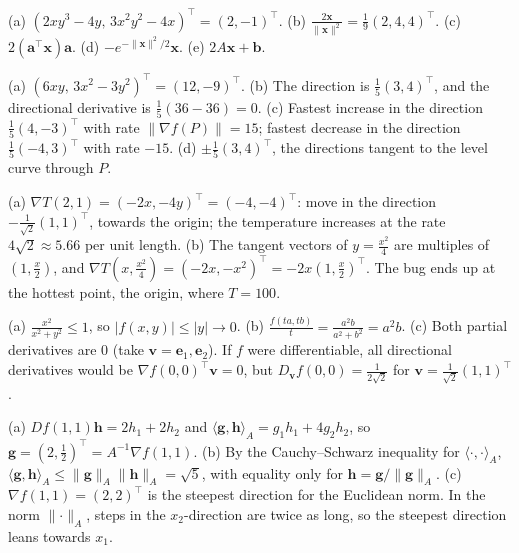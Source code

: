 \documentclass[11pt]{article}
\newcommand{\norm}[1]{\lVert #1 \rVert}
\newcommand{\ip}[2]{\langle #1, #2 \rangle}
\begin{document}
\begin{description}[leftmargin=0pt, itemsep=0.3em]
    \item[\ref{pr:gradients-compute}.] (a) $(2xy^3 - 4y, \, 3x^2y^2 - 4x)^\top = (2, -1)^\top$. (b) $\frac{2\mathbf{x}}{\norm{\mathbf{x}}^2} = \frac{1}{9}(2, 4, 4)^\top$. (c) $2(\mathbf{a}^\top\mathbf{x})\mathbf{a}$. (d) $-e^{-\norm{\mathbf{x}}^2/2}\mathbf{x}$. (e) $2A\mathbf{x} + \mathbf{b}$.
    \item[\ref{pr:directional}.] (a) $(6xy, \, 3x^2 - 3y^2)^\top = (12, -9)^\top$. (b) The direction is $\frac{1}{5}(3, 4)^\top$, and the directional derivative is $\frac{1}{5}(36 - 36) = 0$. (c) Fastest increase in the direction $\frac{1}{5}(4, -3)^\top$ with rate $\norm{\nabla f(P)} = 15$; fastest decrease in the direction $\frac{1}{5}(-4, 3)^\top$ with rate $-15$. (d) $\pm\frac{1}{5}(3, 4)^\top$, the directions tangent to the level curve through $P$.
    \item[\ref{pr:temperature}.] (a) $\nabla T(2, 1) = (-2x, -4y)^\top = (-4, -4)^\top$: move in the direction $-\frac{1}{\sqrt{2}}(1, 1)^\top$, towards the origin; the temperature increases at the rate $4\sqrt{2} \approx 5.66$ per unit length. (b) The tangent vectors of $y = \frac{x^2}{4}$ are multiples of $(1, \frac{x}{2})$, and $\nabla T(x, \frac{x^2}{4}) = (-2x, -x^2)^\top = -2x(1, \frac{x}{2})^\top$. The bug ends up at the hottest point, the origin, where $T = 100$.
    \item[\ref{pr:directional-not-diff}.] (a) $\frac{x^2}{x^2 + y^2} \leq 1$, so $|f(x, y)| \leq |y| \to 0$. (b) $\frac{f(ta, tb)}{t} = \frac{a^2 b}{a^2 + b^2} = a^2 b$. (c) Both partial derivatives are $0$ (take $\mathbf{v} = \mathbf{e}_1, \mathbf{e}_2$). If $f$ were differentiable, all directional derivatives would be $\nabla f(0, 0)^\top\mathbf{v} = 0$, but $D_{\mathbf{v}} f(0, 0) = \frac{1}{2\sqrt{2}}$ for $\mathbf{v} = \frac{1}{\sqrt{2}}(1, 1)^\top$.
    \item[\ref{pr:gradient-ip}.] (a) $Df(1, 1)\mathbf{h} = 2h_1 + 2h_2$ and $\ip{\mathbf{g}}{\mathbf{h}}_A = g_1 h_1 + 4g_2 h_2$, so $\mathbf{g} = (2, \frac{1}{2})^\top = A^{-1}\nabla f(1, 1)$. (b) By the Cauchy--Schwarz inequality for $\ip{\cdot}{\cdot}_A$, $\ip{\mathbf{g}}{\mathbf{h}}_A \leq \norm{\mathbf{g}}_A\norm{\mathbf{h}}_A = \sqrt{5}$, with equality only for $\mathbf{h} = \mathbf{g}/\norm{\mathbf{g}}_A$. (c) $\nabla f(1, 1) = (2, 2)^\top$ is the steepest direction for the Euclidean norm. In the norm $\norm{\cdot}_A$, steps in the $x_2$-direction are twice as long, so the steepest direction leans towards $x_1$.
\end{description}
\end{document}
